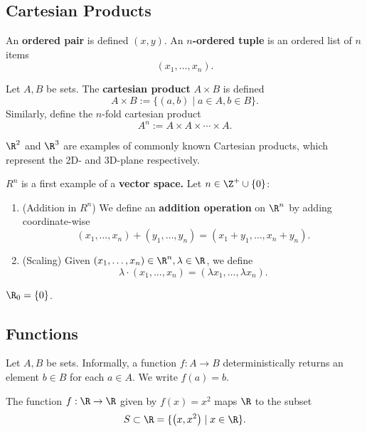 \documentclass[math0540-lecture-notes.tex]{subfiles}
\begin{document}
\subsection{Cartesian Products}
\begin{definition}{}
  An \textbf{ordered pair} is defined $(x, y)$. An $n$\textbf{-ordered tuple} is an ordered list
  of $n$ items \[
    \left(  x_1, \ldots,x_n\right)
  .\] 
\end{definition}

\begin{definition}{}
  Let $A, B$ be sets. The \textbf{cartesian product} $A\times B$ is defined \[
    A\times B := \{(a, b) \mid a\in A,b\in B\} 
  .\] 
  Similarly, define the $n$-fold cartesian product \[
    A^{n} := A\times A\times \cdots \times A
  .\] 
\end{definition}

\begin{example}
  $\R^2$ and $\R^3$ are examples of commonly known Cartesian products, which represent the 2D- and
  3D-plane respectively.
\end{example}

\begin{example}
  $R ^{n}$ is a first example of a \textbf{vector space.} Let $n \in \Z^+\cup \{ 0 \}$:
  \begin{enumerate}
    \item (Addition in $R^{n}$) We define an \textbf{addition operation} on $\R^n$ by adding
      coordinate-wise \[
        \left( x_1,\ldots,x_n \right) + \left( y_1,\ldots,y_n \right)  = \left(
        x_1+y_1,\ldots,x_n+y_n \right)
      .\] 
    \item (Scaling) Given $\left( x_1,\ldots,x_n \right)\in \R^{n}, \lambda\in \R$, we define \[
        \lambda\cdot \left( x_1,\ldots,x_n \right)  = \left( \lambda x_1,\ldots,\lambda x_n \right)
    .\] 
  \end{enumerate}
\end{example}
\begin{remark}
  $\R_0 = \{0\}$.
\end{remark}


\subsection{Functions}
Let $A, B$ be sets. Informally, a function $f: A \to B $ deterministically returns an element $b\in
B$ for each $a\in A$. We write $f(a) =b$.
\begin{example}
  The function $f: \R \to \R $ given by $f(x) = x^2$ maps $\R$ to the subset \[
    S\subset \R = \{\left( x, x^2 \right) \mid x\in \R\}
  .\] 
\end{example}
\end{document}
